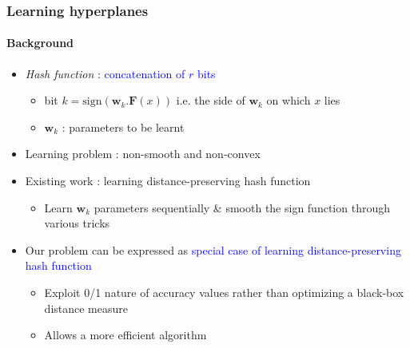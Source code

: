 \documentclass[usenames,dvipsnames, 11pt]{beamer}
\newlength{\wideitemsep}
\let\olditem\item
\renewcommand{\item}{\setlength{\itemsep}{\wideitemsep}\olditem}
\begin{document}
\begin{frame}
\frametitle{Learning hyperplanes}
\framesubtitle{Background}
\begin{itemize}
\pause
\item \emph{Hash function} : \textcolor{blue}{concatenation of $r$ bits} 
\begin{itemize}
\item bit $k=\text{sign}(\textbf{w}_{k}.\textbf{F}(x))$ i.e. the side of $\textbf{w}_{k}$ on which $x$ lies 
\item $\textbf{w}_{k}$ : parameters to be learnt
\end{itemize} \vspace{2pt}
\pause
\item Learning problem : non-smooth and non-convex \vspace{2pt}
\pause
\item Existing work : learning distance-preserving hash function \vspace{2pt}
\begin{itemize}
\item Learn $\textbf{w}_k$ parameters sequentially \& smooth the sign function through various tricks
\end{itemize} \vspace{2pt}
\pause
\item Our problem can be expressed as \textcolor{blue}{special case of learning distance-preserving hash function} 
\begin{itemize}
\item Exploit 0/1 nature of accuracy values rather than optimizing a black-box distance measure
\item Allows a more efficient algorithm
\end{itemize}
\end{itemize}
\end{frame}
\end{document}
